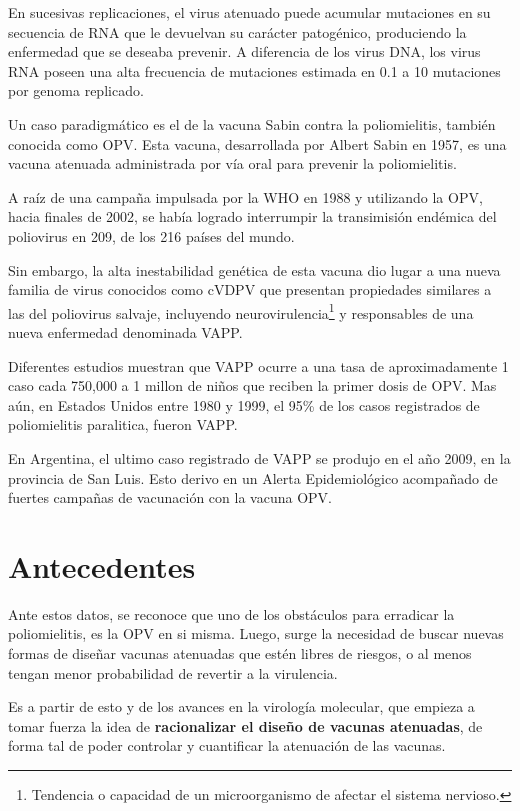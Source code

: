 En sucesivas replicaciones, el virus atenuado puede acumular mutaciones en su
secuencia de \ac{RNA} que le devuelvan su car\'acter patog\'enico, produciendo
la enfermedad que se deseaba prevenir. A diferencia de los virus \ac{DNA}, los
virus \ac{RNA} poseen una alta frecuencia de mutaciones estimada en 0.1 a 10
mutaciones por genoma replicado\cite{Vignuzzi08}.

Un caso paradigm\'atico es el de la vacuna Sabin contra la poliomielitis,
tambi\'en conocida como \ac{OPV}. Esta vacuna, desarrollada por Albert Sabin en
1957, es una vacuna atenuada administrada por v\'ia oral para prevenir la
poliomielitis. 

A ra\'iz de una campa\~na impulsada por la \ac{WHO} en 1988 y utilizando la
\ac{OPV}, hacia finales de 2002, se hab\'ia logrado interrumpir la
transimisi\'on end\'emica del poliovirus en 209, de los 216 pa\'ises del
mundo\cite{Aylward04}. 

Sin embargo, la alta inestabilidad gen\'etica de esta vacuna dio lugar a
una nueva familia de virus conocidos como \ac{cVDPV} que presentan propiedades
similares a las del poliovirus salvaje, incluyendo
neurovirulencia\footnote{Tendencia o capacidad de un microorganismo de afectar
el sistema nervioso.} y responsables de una nueva enfermedad denominada
\ac{VAPP}. 

Diferentes estudios muestran que \ac{VAPP} ocurre a una tasa de
aproximadamente 1 caso cada 750,000 a 1 millon de ni\~nos que reciben la
primer dosis de \ac{OPV}\cite{Aylward04}. Mas a\'un, en Estados Unidos entre
1980 y 1999, el 95\% de los casos registrados de poliomielitis paralitica,
fueron \ac{VAPP}\cite{DeJesus07}.

En Argentina, el ultimo caso registrado de \ac{VAPP} se produjo en el a\~no
2009, en la provincia de San Luis\cite{msal09}. Esto derivo en un Alerta
Epidemiol\'ogico acompa\~nado de fuertes campa\~nas de vacunaci\'on con la
vacuna \ac{OPV}.

\section{Antecedentes}
\label{antecedentes}
Ante estos datos, se reconoce que uno de los obst\'aculos para erradicar la
poliomielitis, es la \ac{OPV} en si misma\cite{Chumakov08}. Luego, surge la
necesidad de buscar nuevas formas de dise\~nar vacunas atenuadas que est\'en
libres de riesgos, o al menos tengan menor probabilidad de revertir a la
virulencia.

Es a partir de esto y de los avances en la virolog\'ia molecular, que empieza
a tomar fuerza la idea de \textbf{racionalizar el dise\~no de vacunas
atenuadas}, de forma tal de poder controlar y cuantificar la atenuaci\'on de las
vacunas\cite{Lauring10}.

